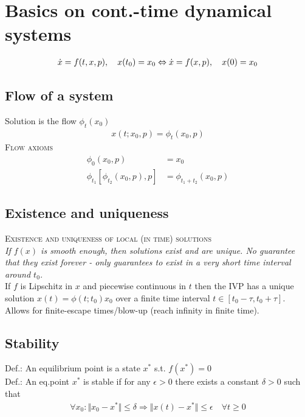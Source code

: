 

\section{Basics on cont.-time dynamical systems}
\begin{align*}
\dot{x} = f(t,x,p), \quad x(t_0) = x_0 \Leftrightarrow \dot{x} = f(x,p), \quad x(0)=x_0
\end{align*}
\subsection{Flow of a system}
Solution is the flow $\phi_t(x_0)$
\begin{align*}
x(t;x_0,p)=\phi_t(x_0,p)
\end{align*}
\textsc{Flow axioms}\\
\begin{align*}
\phi_0(x_0,p)&=x_0\\
\phi_{t_1}[\phi_{t_2}(x_0,p),p] &= \phi_{t_1+t_2}(x_0,p)
\end{align*}
\subsection{Existence and uniqueness}
\textsc{Existence and uniqueness of local (in time) solutions}\\
\emph{If $f(x)$ is smooth enough, then solutions exist and are unique. No guarantee that they exist forever - only guarantees to exist in a very short time interval around $t_0$.}\\
If $f$ is Lipschitz in $x$ and piecewise continuous in $t$ then the IVP has a unique solution $x(t)=\phi(t;t_0)x_0$ over a finite time interval $t\in[t_0-\tau,t_0+\tau]$.\\
Allows for finite-escape times/blow-up (reach infinity in finite time).

\subsection{Stability}
Def.: An equilibrium point is a state $x^*$ s.t. $f(x^*)=0$\\
Def.: An eq.point $x^*$ is stable if for any $\epsilon>0$ there exists a constant $\delta > 0$ such that \begin{align*}
\forall x_0: \Vert x_0 - x^* \Vert \leq \delta \Rightarrow \Vert x(t)-x^* \Vert \leq \epsilon \quad \forall t \geq 0
\end{align*}

